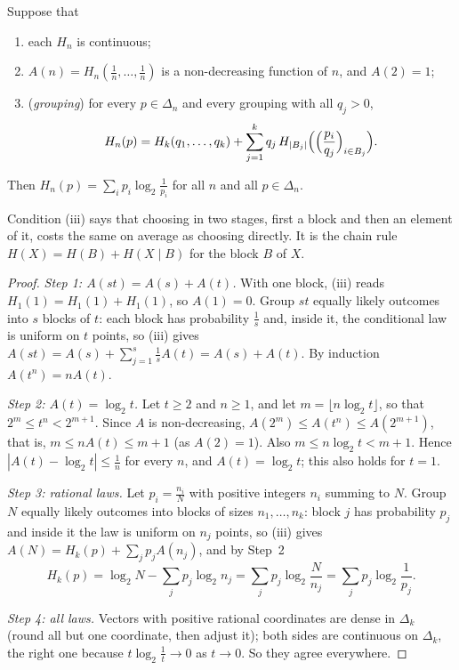 \begin{theorem}[Shannon 1948]\label{thm:axioms}
Suppose that
\begin{enumerate}[label=(\roman*)]
\item each $H_n$ is continuous;
\item $A(n)=H_n(\frac1n,\dots,\frac1n)$ is a non-decreasing function of $n$, and $A(2)=1$;
\item (\emph{grouping}) for every $p\in\Delta_n$ and every grouping with all $q_j>0$,
\[
H_n(p)=H_k(q_1,\dots,q_k)+\sum_{j=1}^kq_j\,H_{|B_j|}\Bigl(\Bigl(\frac{p_i}{q_j}\Bigr)_{i\in B_j}\Bigr).
\]
\end{enumerate}
Then $H_n(p)=\sum_ip_i\log_2\frac1{p_i}$ for all $n$ and all $p\in\Delta_n$.
\end{theorem}

Condition (iii) says that choosing in two stages, first a block and then an element of it, costs the same on average as choosing directly. It is the chain rule $H(X)=H(B)+H(X\mid B)$ for the block $B$ of $X$.

\begin{proof}
\emph{Step 1: $A(st)=A(s)+A(t)$.} With one block, (iii) reads $H_1(1)=H_1(1)+H_1(1)$, so $A(1)=0$. Group $st$ equally likely outcomes into $s$ blocks of $t$: each block has probability $\frac1s$ and, inside it, the conditional law is uniform on $t$ points, so (iii) gives $A(st)=A(s)+\sum_{j=1}^s\frac1sA(t)=A(s)+A(t)$. By induction $A(t^n)=nA(t)$.

\emph{Step 2: $A(t)=\log_2t$.} Let $t\ge2$ and $n\ge1$, and let $m=\lfloor n\log_2t\rfloor$, so that $2^m\le t^n<2^{m+1}$. Since $A$ is non-decreasing, $A(2^m)\le A(t^n)\le A(2^{m+1})$, that is, $m\le nA(t)\le m+1$ (as $A(2)=1$). Also $m\le n\log_2t<m+1$. Hence $|A(t)-\log_2t|\le\frac1n$ for every $n$, and $A(t)=\log_2t$; this also holds for $t=1$.

\emph{Step 3: rational laws.} Let $p_i=\frac{n_i}N$ with positive integers $n_i$ summing to $N$. Group $N$ equally likely outcomes into blocks of sizes $n_1,\dots,n_k$: block $j$ has probability $p_j$ and inside it the law is uniform on $n_j$ points, so (iii) gives $A(N)=H_k(p)+\sum_jp_jA(n_j)$, and by Step~2
\[
H_k(p)=\log_2N-\sum_jp_j\log_2n_j=\sum_jp_j\log_2\frac N{n_j}=\sum_jp_j\log_2\frac1{p_j}.
\]

\emph{Step 4: all laws.} Vectors with positive rational coordinates are dense in $\Delta_k$ (round all but one coordinate, then adjust it); both sides are continuous on $\Delta_k$, the right one because $t\log_2\frac1t\to0$ as $t\to0$. So they agree everywhere.
\end{proof}

